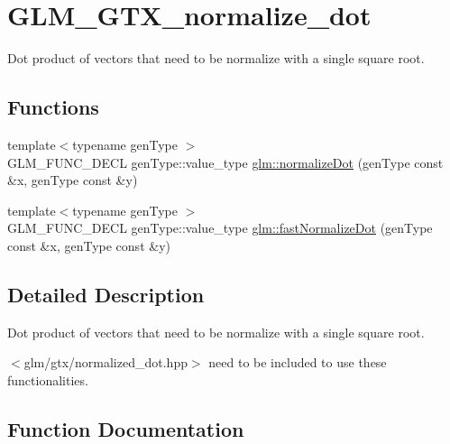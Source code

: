 \hypertarget{group__gtx__normalize__dot}{}\section{G\+L\+M\+\_\+\+G\+T\+X\+\_\+normalize\+\_\+dot}
\label{group__gtx__normalize__dot}


Dot product of vectors that need to be normalize with a single square root.  


\subsection*{Functions}
\begin{DoxyCompactItemize}
\item 
{\footnotesize template$<$typename gen\+Type $>$ }\\G\+L\+M\+\_\+\+F\+U\+N\+C\+\_\+\+D\+E\+CL gen\+Type\+::value\+\_\+type \hyperlink{group__gtx__normalize__dot_ga13b81f0882c1811cb6c99a5864b9c152}{glm\+::normalize\+Dot} (gen\+Type const \&x, gen\+Type const \&y)
\item 
{\footnotesize template$<$typename gen\+Type $>$ }\\G\+L\+M\+\_\+\+F\+U\+N\+C\+\_\+\+D\+E\+CL gen\+Type\+::value\+\_\+type \hyperlink{group__gtx__normalize__dot_gaeb26ec35a51c30dbd0d91f9da45eeafe}{glm\+::fast\+Normalize\+Dot} (gen\+Type const \&x, gen\+Type const \&y)
\end{DoxyCompactItemize}


\subsection{Detailed Description}
Dot product of vectors that need to be normalize with a single square root. 

$<$glm/gtx/normalized\+\_\+dot.\+hpp$>$ need to be included to use these functionalities. 

\subsection{Function Documentation}
